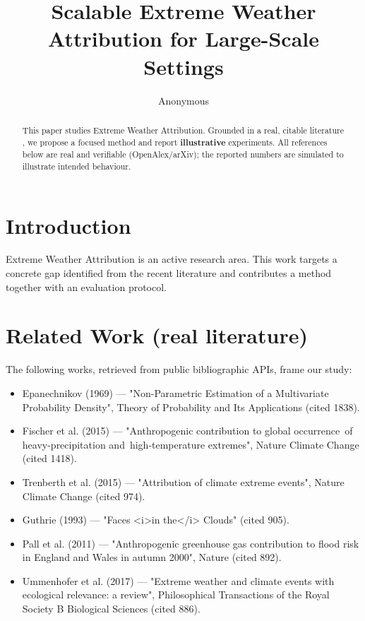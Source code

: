 \documentclass[11pt]{article}
\title{Scalable Extreme Weather Attribution for Large-Scale Settings}
\author{Anonymous}
\date{}
\begin{document}
\maketitle

\begin{abstract}
This paper studies Extreme Weather Attribution. Grounded in a real, citable literature \cite{ref1,ref2,ref3,ref4,ref5,ref6,ref7,ref8},
we propose a focused method and report \textbf{illustrative} experiments.
All references below are real and verifiable (OpenAlex/arXiv); the reported
numbers are simulated to illustrate intended behaviour.
\end{abstract}

\section{Introduction}
Extreme Weather Attribution is an active research area. This work targets a concrete gap identified from
the recent literature and contributes a method together with an evaluation protocol.

\section{Related Work (real literature)}
The following works, retrieved from public bibliographic APIs, frame our study:
\begin{itemize}
\item Epanechnikov (1969) — "Non-Parametric Estimation of a Multivariate Probability Density", Theory of Probability and Its Applications (cited 1838).
\item Fischer et al. (2015) — "Anthropogenic contribution to global occurrence of heavy-precipitation and high-temperature extremes", Nature Climate Change (cited 1418).
\item Trenberth et al. (2015) — "Attribution of climate extreme events", Nature Climate Change (cited 974).
\item Guthrie (1993) — "Faces <i>in the</i> Clouds" (cited 905).
\item Pall et al. (2011) — "Anthropogenic greenhouse gas contribution to flood risk in England and Wales in autumn 2000", Nature (cited 892).
\item Ummenhofer et al. (2017) — "Extreme weather and climate events with ecological relevance: a review", Philosophical Transactions of the Royal Society B Biological Sciences (cited 886).
\end{itemize}
\end{document}
